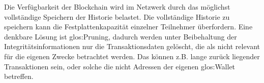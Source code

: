 Die Verfügbarkeit der Blockchain wird im Netzwerk durch das möglichst vollständige Speichern der Historie belastet.
Die vollständige Historie zu speichern kann die Festplattenkapazität einzelner Teilnehmer überfordern.
Eine denkbare Lösung ist \gls{glos:Pruning}, dadurch werden unter Beibehaltung der Integritätsinformationen nur die Transaktionsdaten gelöscht, die als nicht relevant für die eigenen Zwecke betrachtet werden. Das können z.B. lange zurück liegender Transaktionen sein, oder solche die nicht Adressen der eigenen \gls{glos:Wallet} betreffen.

